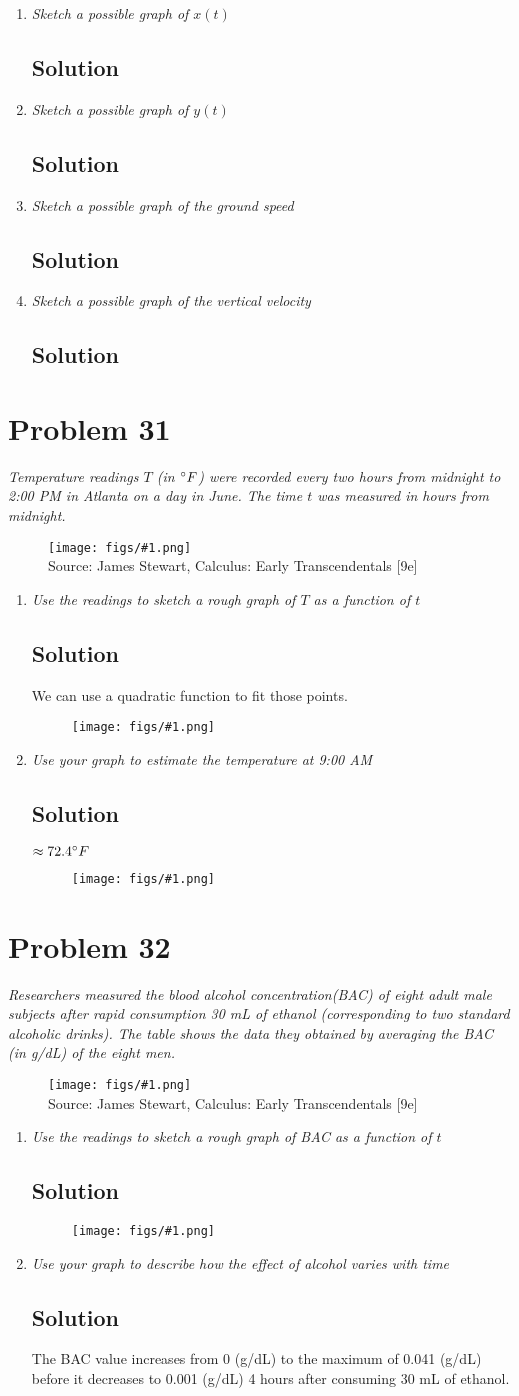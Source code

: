 \documentclass[11pt]{article}
\newcommand{\soln}{\subsection*}
\newcommand{\qn}{\textit}
\newcommand{\imagesource}[1]{{\footnotesize Source: #1}}
\newcommand{\imgqn}[1]{
	\begin{figure}[h]
		\centering
		\texttt{[image: figs/\#1.png]}\\
		\imagesource{James Stewart, Calculus: Early Transcendentals [9e]}
	\end{figure}
}
\newcommand{\imgsoln}[1]{
	\begin{figure}[h]
		\centering
		\texttt{[image: figs/\#1.png]}
	\end{figure}
}
\begin{document}
\begin{enumerate}
	\item \qn{Sketch a possible graph of $x(t)$}
	\soln{Solution}
	
	\item \qn{Sketch a possible graph of $y(t)$}
	\soln{Solution}
	
	\item \qn{Sketch a possible graph of the ground speed}
	\soln{Solution}
	
	\item \qn{Sketch a possible graph of the vertical velocity}
	\soln{Solution}
\end{enumerate}

\section*{Problem 31}

\qn{Temperature readings $T$ (in $\degree F$) were recorded every two hours from midnight to 2:00 PM in Atlanta on a day in June. The time $t$ was measured in hours from midnight.}

\imgqn{1.1.31}

\begin{enumerate}
	\item \qn{Use the readings to sketch a rough graph of $T$ as a function of $t$}
	\soln{Solution}
	We can use a quadratic function to fit those points.
	\imgsoln{1.1.31-ans.a}
	
	\item \qn{Use your graph to estimate the temperature at 9:00 AM}
	\soln{Solution}
	$\approx 72.4 \degree F$
	\imgsoln{1.1.31-ans.b}
\end{enumerate}

\section*{Problem 32}

\qn{Researchers measured the blood alcohol concentration(BAC) of eight adult male subjects after rapid consumption 30 mL of ethanol (corresponding to two standard alcoholic drinks). The table shows the data they obtained by averaging the BAC (in g/dL) of the eight men.}

\imgqn{1.1.32}

\begin{enumerate}
	\item \qn{Use the readings to sketch a rough graph of BAC as a function of $t$}
	\soln{Solution}
	\imgsoln{1.1.32-ans.a}
	
	\item \qn{Use your graph to describe how the effect of alcohol varies with time}
	\soln{Solution}
	The BAC value increases from 0 (g/dL) to the maximum of 0.041 (g/dL) before it decreases to 0.001 (g/dL) 4 hours after consuming 30 mL of ethanol.
\end{enumerate}
\end{document}
